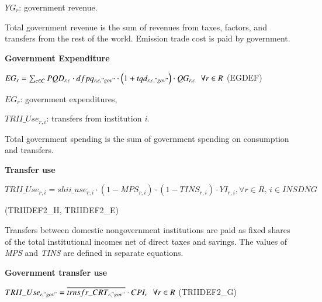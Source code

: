\documentclass[10pt,a4paper,titlepage,dvipdfmx]{book}
\begin{document}
\begin{flushleft} $YG_{r}$: government revenue. \end{flushleft}

Total government revenue is the sum of revenues from taxes, factors, and transfers from the rest of the world. Emission trade cost is paid by government.

\begin{flushleft}\textbf{Government Expenditure}\end{flushleft}


\begin{center}$EG_{r}=\sum _{c\in C}PQD_{r,c}\cdot dfpq_{r,c,"gov"}\cdot \left(1+tqd_{r,c,"gov"}\right)\cdot QG_{r,c}\,\,\,\,\forall r\in R$ (EGDEF)
\end{center}

\begin{flushleft}
$EG_{r}$: government expenditures,

$TRII\_Use_{r,i}$: transfers from institution \textit{i}.
\end{flushleft}

Total government spending is the sum of government spending on consumption and transfers.

\begin{flushleft}\textbf{Transfer use}\end{flushleft}


\begin{center}$TRII\_ Use_{r,i}=shii\_ use_{r,i}\cdot \left(1-MPS_{r,i}\right)\cdot \left(1-TINS_{r,i}\right)\cdot YI_{r,i},\forall r\in R,\,i\in INSDNG$
\end{center}


\begin{flushright}(TRIIDEF2\_H, TRIIDEF2\_E)
\end{flushright}

Transfers between domestic nongovernment institutions are paid as fixed shares of the total institutional incomes net of direct taxes and savings. The values of \textit{MPS} and \textit{TINS} are defined in separate equations.

\begin{flushleft}\textbf{Government transfer use}\end{flushleft}


\begin{center}$TRII\_ Use_{r,"gov"}=\overline{trnsfr\_ CRT_{r,"gov"}}\cdot CPI_{r}\,\,\,\,\forall r\in R$ (TRIIDEF2\_G)
\end{center}
\end{document}
